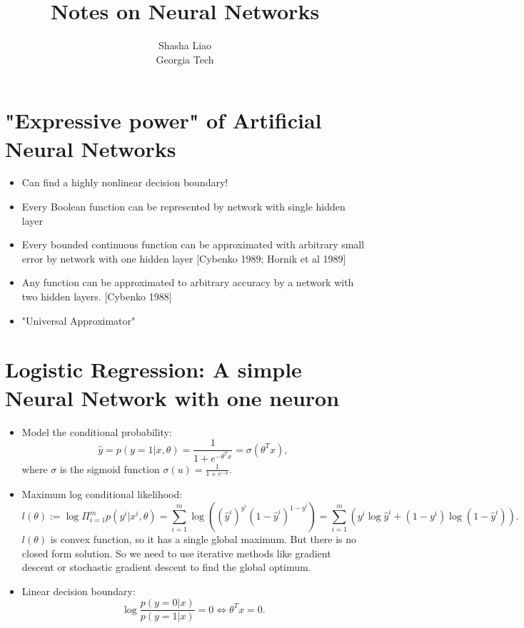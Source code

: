 \documentclass[twoside,12pt]{article}
\begin{document}
\title{Notes on Neural Networks}
\author {Shasha Liao \\ Georgia Tech}
\maketitle
\section{"Expressive power" of Artificial Neural Networks}
\begin{itemize}
\item Can find a highly nonlinear decision boundary!
\item Every Boolean function can be represented by network with single hidden layer
\item Every bounded continuous function can be approximated with arbitrary small error by network with one hidden layer [Cybenko 1989; Hornik et al 1989]
\item Any function can be approximated to arbitrary accuracy by a network with two hidden layers. [Cybenko 1988] 
\item "Universal Approximator"
\end{itemize}
\section{ Logistic Regression: A simple Neural Network with one neuron}
\begin{itemize}
\item Model the conditional probability: $$\hat{y} = p(y=1|x,\theta) = \frac{1}{1+e^{-\theta^Tx}} = \sigma(\theta^Tx),$$ where $\sigma$ is the sigmoid function $\sigma(u) = \frac{1}{1+e^{-u}}$. 
\item Maximum log conditional likelihood: $$l(\theta) := \log\Pi_{i=1}^m p(y^i|x^i,\theta)  = \sum_{i=1}^m \log((\hat{y}^i)^{y^i}(1 - \hat{y}^i)^{1 -y^i}) = \sum_{i=1}^m (y^i\log \hat{y}^i + (1-y^i)\log(1- \hat{y}^i) ).$$
$l(\theta)$ is convex function, so it has a single global maximum. But there is no closed form solution. So we need to use iterative methods like gradient descent or stochastic gradient descent to find the global optimum.
\item Linear decision boundary: $$\log \frac{p(y=0|x)}{p(y=1|x)} = 0 \Longleftrightarrow  \theta^Tx = 0.$$
\end{itemize}
\end{document}
